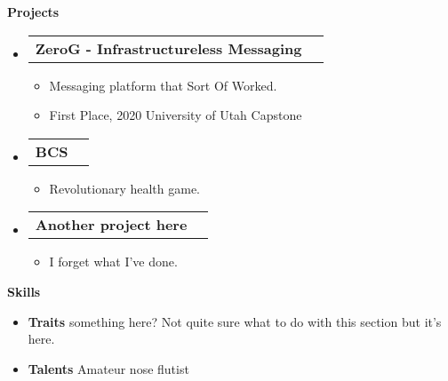 \documentclass[letterpaper,12pt]{article}[leftmargin=*]
\makeatletter
\def \entryspacing {-0pt}
\renewcommand{\section}[2]{\vspace{5pt}
  \colorbox{secondary}{\color{white}\raggedbottom\normalsize\textbf{{#1}{\hspace{7pt}#2}}}
}
\newcommand{\resumeEntryStart}{\begin{itemize}[leftmargin=2.5mm]}
\newcommand{\resumeEntryEnd}{\end{itemize}\vspace{\entryspacing}}
\newcommand{\resumeItemListStart}{\begin{itemize}[leftmargin=4.5mm]}
\newcommand{\resumeItemListEnd}{\end{itemize}}
\newcommand{\resumeItem}[1]{
  \item\small{
    {#1 \vspace{-2pt}}
  }
}
\newcommand{\resumeEntryTD}[2]{
  \vspace{-1pt}\item[]
    \begin{tabularx}{0.97\textwidth}{X@{\hspace{60pt}}r}
      \textbf{\color{primary}#1} & {\firabook\color{accent}\small#2} \\
    \end{tabularx}\vspace{-6pt}
}
\newcommand{\resumeEntryS}[2]{
  \item[]\small{
    \textbf{\color{primary}#1 }{ #2 \vspace{-6pt}}
  }
}
\makeatother
\begin{document}
\section{\faFlask}{Projects}

  \resumeEntryStart
    \resumeEntryTD
      {ZeroG - Infrastructureless Messaging}{}
    \resumeItemListStart
      \resumeItem {Messaging platform that Sort Of Worked.}
      \resumeItem {First Place, 2020 University of Utah Capstone}
    \resumeItemListEnd
  \resumeEntryEnd

  \resumeEntryStart
    \resumeEntryTD
      {BCS}{}
    \resumeItemListStart
      \resumeItem {Revolutionary health game.}
    \resumeItemListEnd
  \resumeEntryEnd

  \resumeEntryStart
    \resumeEntryTD
      {Another project here}{}
    \resumeItemListStart
      \resumeItem {I forget what I've done.}
    \resumeItemListEnd
  \resumeEntryEnd

\section{\faGears}{Skills}
 \resumeEntryStart
  \resumeEntryS{Traits } {something here? Not quite sure what to do with this section but it's here.}
  \resumeEntryS{Talents } {Amateur nose flutist}
 \resumeEntryEnd
\end{document}
